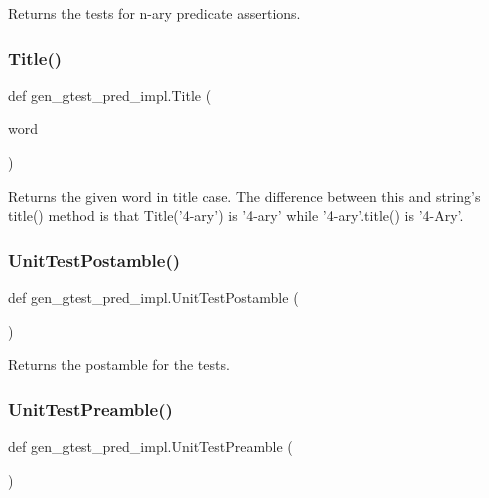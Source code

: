 \begin{DoxyVerb}Returns the tests for n-ary predicate assertions.\end{DoxyVerb}
 \mbox{\label{namespacegen__gtest__pred__impl_ae49dd9bd9152dbcb3ca7994ce04c37ba}} 
\subsubsection{\texorpdfstring{Title()}{Title()}}
{\footnotesize\ttfamily def gen\+\_\+gtest\+\_\+pred\+\_\+impl.\+Title (\begin{DoxyParamCaption}\item[{}]{word }\end{DoxyParamCaption})}

\begin{DoxyVerb}Returns the given word in title case.  The difference between
this and string's title() method is that Title('4-ary') is '4-ary'
while '4-ary'.title() is '4-Ary'.\end{DoxyVerb}
 \mbox{\label{namespacegen__gtest__pred__impl_a57b922f50d0807896496dcd883c1f098}} 
\subsubsection{\texorpdfstring{UnitTestPostamble()}{UnitTestPostamble()}}
{\footnotesize\ttfamily def gen\+\_\+gtest\+\_\+pred\+\_\+impl.\+Unit\+Test\+Postamble (\begin{DoxyParamCaption}{ }\end{DoxyParamCaption})}

\begin{DoxyVerb}Returns the postamble for the tests.\end{DoxyVerb}
 \mbox{\label{namespacegen__gtest__pred__impl_ae52dc86461d1b666c7b658a8c27c69f9}} 
\subsubsection{\texorpdfstring{UnitTestPreamble()}{UnitTestPreamble()}}
{\footnotesize\ttfamily def gen\+\_\+gtest\+\_\+pred\+\_\+impl.\+Unit\+Test\+Preamble (\begin{DoxyParamCaption}{ }\end{DoxyParamCaption})}


